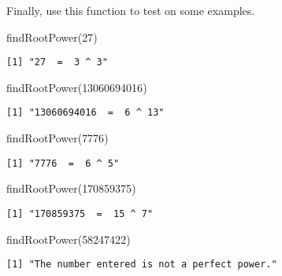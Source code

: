 \documentclass[
  letterpaper,
  DIV=11,
  numbers=noendperiod]{scrartcl}
\newenvironment{Shaded}{\begin{snugshade}}{\end{snugshade}}
\newcommand{\DecValTok}[1]{\textcolor[rgb]{0.68,0.00,0.00}{#1}}
\newcommand{\FunctionTok}[1]{\textcolor[rgb]{0.28,0.35,0.67}{#1}}
\newcommand{\NormalTok}[1]{\textcolor[rgb]{0.00,0.23,0.31}{#1}}
\begin{document}
Finally, use this function to test on some examples.

\begin{Shaded}
\begin{Highlighting}[]
\FunctionTok{findRootPower}\NormalTok{(}\DecValTok{27}\NormalTok{)}
\end{Highlighting}
\end{Shaded}

\begin{verbatim}
[1] "27  =  3 ^ 3"
\end{verbatim}

\begin{Shaded}
\begin{Highlighting}[]
\FunctionTok{findRootPower}\NormalTok{(}\DecValTok{13060694016}\NormalTok{)}
\end{Highlighting}
\end{Shaded}

\begin{verbatim}
[1] "13060694016  =  6 ^ 13"
\end{verbatim}

\begin{Shaded}
\begin{Highlighting}[]
\FunctionTok{findRootPower}\NormalTok{(}\DecValTok{7776}\NormalTok{)}
\end{Highlighting}
\end{Shaded}

\begin{verbatim}
[1] "7776  =  6 ^ 5"
\end{verbatim}

\begin{Shaded}
\begin{Highlighting}[]
\FunctionTok{findRootPower}\NormalTok{(}\DecValTok{170859375}\NormalTok{)}
\end{Highlighting}
\end{Shaded}

\begin{verbatim}
[1] "170859375  =  15 ^ 7"
\end{verbatim}

\begin{Shaded}
\begin{Highlighting}[]
\FunctionTok{findRootPower}\NormalTok{(}\DecValTok{58247422}\NormalTok{)}
\end{Highlighting}
\end{Shaded}

\begin{verbatim}
[1] "The number entered is not a perfect power."
\end{verbatim}
\end{document}
